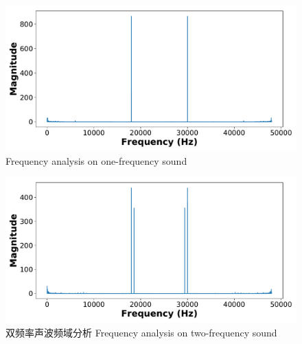 \begin{figure}
  \centering
  \begin{minipage}[t]{0.49\textwidth}
    \centering
    \includegraphics[width=\textwidth]{figure/one-freq-fft.pdf}
      {Frequency analysis on one-frequency sound}
        \label{fig:frequency-analysis-one-frequency}
  \end{minipage}
  \centering
  \begin{minipage}[t]{0.49\textwidth}
    \centering
    \includegraphics[width=\textwidth]{figure/two-freq-fft.pdf}
    \bicaption
    {双频率声波频域分析}
    {Frequency analysis on two-frequency sound}
    \label{fig:frequency-analysis-two-frequency}
   \end{minipage}
\end{figure}

